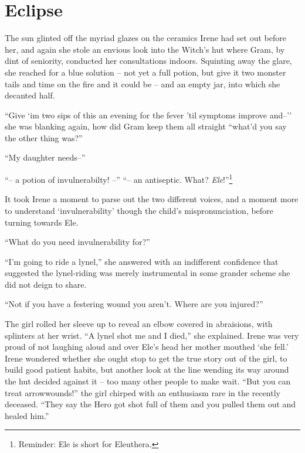 \documentclass[../FGP.tex]{subfiles}
\begin{document}
\section{Eclipse}
\begin{fragment}
\end{fragment}
\begin{fragment}
The sun glinted off the myriad glazes on the ceramics Irene had set out before her, and again she stole an envious look into the Witch's hut where Gram, by dint of seniority, conducted her consultations indoors. Squinting away the glare, she reached for a blue solution -- not yet a full potion, but give it two monster tails and time on the fire and it could be -- and an empty jar, into which she decanted half. 

``Give `im two sips of this an evening for the fever 'til symptoms improve and--'' she was blanking again, how did Gram keep them all straight ``what'd you say the other thing was?''

``My daughter needs--''

``-- a potion of invulnerabilty! --''\qquad
``-- an antiseptic. What? \emph{Ele}!''\footnote{Reminder: Ele is short for Eleuthera.}

It took Irene a moment to parse out the two different voices, and a moment more to understand `invulnerability' though the child's mispronunciation, before turning towards Ele. 

``What do you need invulnerability for?''

``I'm going to ride a lynel,'' she answered with an indifferent confidence that suggested the lynel-riding was merely instrumental in some grander scheme she did not deign to share.

``Not if you have a festering wound you aren't. Where are you injured?''

The girl rolled her sleeve up to reveal an elbow covered in abraisions, with splinters at her wrist. ``A lynel shot me and I died,'' she explained. Irene was very proud of not laughing aloud and over Ele's head her mother mouthed `she fell.' Irene wondered whether she ought stop to get the true story out of the girl, to build good patient habits, but another look at the line wending its way around the hut decided against it -- too many other people to make wait. ``But you can treat arrowwounds!'' the girl chirped with an enthusiasm rare in the recently deceased. ``They say the Hero got shot full of them and you pulled them out and healed him.'' 


\end{fragment}
\end{document}
